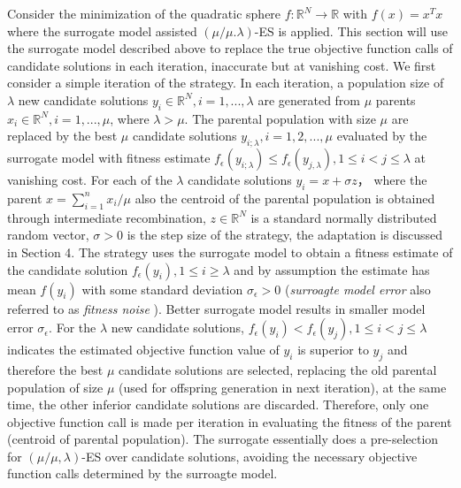 Consider the minimization of the quadratic sphere $f: \mathbb R^N \rightarrow \mathbb R$ with $f(x)=x^Tx$ where the surrogate model assisted $(\mu/\mu.\lambda)$-ES is applied. This section will use the surrogate model described above to replace the true objective function calls of candidate solutions in each iteration, inaccurate but at vanishing cost. We first consider a simple iteration of the strategy. In each iteration, a population size of $\lambda$ new candidate solutions $y_i \in \mathbb{R}^N,i = 1,...,\lambda $ are generated from $\mu$ parents $x_i \in \mathbb{R}^N, i=1,...,\mu$, where $\lambda>\mu$. The parental population with size $\mu$ are replaced by the best $\mu$ candidate solutions $y_{i;\lambda},i = 1,2,...,\mu$ evaluated by the surrogate model with fitness estimate $f_{\epsilon}(y_{i;\lambda}) \leq f_{\epsilon}(y_{j,\lambda}), 1 \leq i < j \leq \lambda$ at vanishing cost. For each of the $\lambda$ candidate solutions $y_i=x + \sigma z$， where the parent $x = \sum_{i=1}^n x_i/\mu$ also the centroid of the parental population is obtained through intermediate recombination, $z \in  \mathbb R^N$ is a standard normally distributed random vector, $\sigma > 0$ is the step size of the strategy, the adaptation is discussed in Section 4. The strategy uses the surrogate model to obtain a fitness estimate of the candidate solution $f_{\epsilon} (y_i), 1 \leq i \geq \lambda$ and by assumption the estimate has mean $f(y_i)$ with some standard deviation $\sigma_\epsilon > 0$ (\textit{surroagte model error} also referred to as \textit{fitness noise} \cite{1284729}). Better surrogate model results in smaller model error $\sigma_\epsilon$. For the $\lambda$ new candidate solutions, $f_\epsilon (y_i) < f_\epsilon (y_j), 1 \leq i < j \leq \lambda$ indicates the estimated objective function value of $y_i$ is superior to $y_j$ and therefore the best $\mu$ candidate solutions are selected, replacing the old parental population of size $\mu$ (used for offspring generation in next iteration), at the same time, the other inferior candidate solutions are discarded. Therefore, only one objective function call is made per iteration in evaluating the fitness of the parent (centroid of parental population). The surrogate essentially does a pre-selection for $(\mu/\mu,\lambda)$-ES over candidate solutions, avoiding the necessary objective function calls determined by the surroagte model.  


